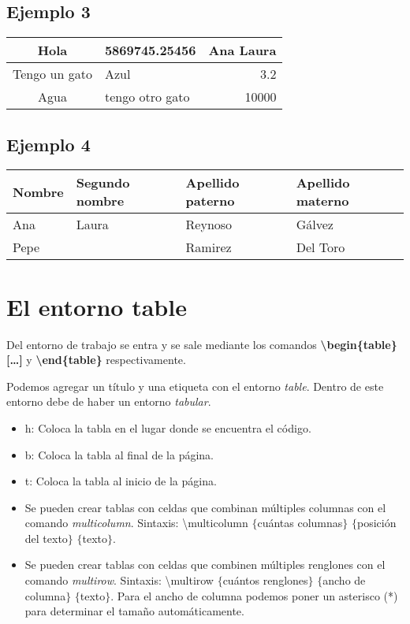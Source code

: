 \documentclass{article}
\begin{document}
\subsection{Ejemplo 3}
\begin{center} %
	\begin{tabular}{|c|l|r|||} \hline
		Hola 		  & 5869745.25456   & Ana Laura \\ \hline
		Tengo un gato & Azul 		    & 3.2       \\ \hline \hline
		Agua 		  & tengo otro gato & 10000     \\ \hline 
	\end{tabular}
\end{center}

\subsection{Ejemplo 4}
\begin{tabular}{|l|l|l|l|} \hline
	\textbf{Nombre} & Segundo nombre & Apellido paterno & Apellido materno \\ \hline
	Ana	   & Laura          & Reynoso          & Gálvez			  \\ \cline{2-3}
	Pepe   &                & Ramirez		   & Del Toro         \\ \hline
\end{tabular}




\newpage
\section{El entorno table}
Del entorno de trabajo se entra y se sale mediante los comandos \textbf{\textbackslash begin\{table\} [\dots ]}  y \textbf{\textbackslash end\{table\}} respectivamente. 

Podemos agregar un título y una etiqueta con el entorno \textit{table}. Dentro de este entorno debe de haber un entorno \textit{tabular}.

\begin{itemize}
	\item h: Coloca la tabla en el lugar donde se encuentra el código.
	\item b: Coloca la tabla al final de la página.
	\item t: Coloca la tabla al inicio de la página. 
	\item Se pueden crear tablas con celdas que combinan múltiples columnas con el comando 					  \textit{multicolumn}. Sintaxis: \textbackslash multicolumn $\lbrace$cuántas columnas$\rbrace$ $\lbrace$posición del texto$\rbrace$ $\lbrace$texto$\rbrace$.
	\item Se pueden crear tablas con celdas que combinen múltiples renglones con el comando 				  \textit{multirow}. Sintaxis: \textbackslash multirow $\lbrace$cuántos renglones$\rbrace				$ $\lbrace$ancho de columna$\rbrace$ $\lbrace$texto$\rbrace$. Para el ancho de 						columna podemos poner un asterisco (*) para determinar el tamaño automáticamente.
\end{itemize}
\end{document}
